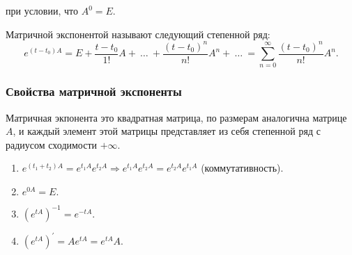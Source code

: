 при условии, что $A^0 = E.$

\begin{definition}
	Матричной экспонентой называют следующий степенной ряд:
	\begin{equation*}
		e^{(t-t_0)A} = E + \frac{t-t_0}{1!}A +\ \dots\ + \frac{(t-t_0)^n}{n!}A^n+\ \dots\ = \sum\limits_{n = 0}^{\infty} \frac{(t-t_0)^n}{n!}A^n.
	\end{equation*}
\end{definition}

\subsubsection{Свойства матричной экспоненты}

Матричная экпонента это квадратная матрица, по размерам аналогична матрице $A$, и каждый элемент этой матрицы представляет из себя степенной ряд с радиусом сходимости $+\infty$.

\begin{enumerate}
	\item $e^{(t_1+t_2)A} = e^{t_1A}e^{t_2A} \Rightarrow e^{t_1A}e^{t_2A} = e^{t_2A}e^{t_1A}$ (коммутативность).
		
	\item $ e^{0 A} = E.$	
	
	\item $\left(e^{tA}\right)^{-1} = e^{-tA}.$
		
	\item $(e^{tA})^{'} = A e^{tA} = e^{tA}A.$

\end{enumerate}

